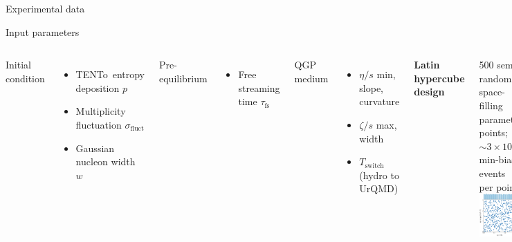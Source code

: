 \documentclass{beamer}
\newcommand{\trento}{T\raisebox{-0.3ex}{R}ENTo}
\begin{document}
\begin{frame}{Experimental data}

\end{frame}

\begin{frame}{Input parameters}
  \begin{columns}
    Initial condition
    \begin{itemize}
      \item \trento\ entropy deposition $p$
      \item Multiplicity fluctuation $\sigma_\text{fluct}$
      \item Gaussian nucleon width $w$
    \end{itemize}
    \medskip
    Pre-equilibrium
    \begin{itemize}
      \item Free streaming time $\tau_\text{fs}$
    \end{itemize}
    \medskip
    QGP medium
    \begin{itemize}
      \item $\eta/s$ min, slope, curvature
      \item $\zeta/s$ max, width
      \item $T_\text{switch}$ (hydro to UrQMD)
    \end{itemize}
    \begin{center}
      \textbf{Latin hypercube design}
    \end{center}
    500 semi-random, space-filling parameter points;
    ${\sim}3 \times 10^4$ min-bias events per point \\[1em]
    \includegraphics{design}
  \end{columns}
\end{frame}
\end{document}
